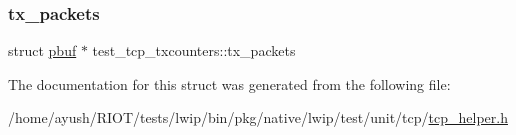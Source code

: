 \mbox{\label{structtest__tcp__txcounters_a9e8e4ba7e34d0fc4f9a839bd75832ead}} 
\subsubsection{\texorpdfstring{tx\+\_\+packets}{tx\_packets}}
{\footnotesize\ttfamily struct \hyperlink{structpbuf}{pbuf} $\ast$ test\+\_\+tcp\+\_\+txcounters\+::tx\+\_\+packets}



The documentation for this struct was generated from the following file\+:\begin{DoxyCompactItemize}
\item 
/home/ayush/\+R\+I\+O\+T/tests/lwip/bin/pkg/native/lwip/test/unit/tcp/\hyperlink{native_2lwip_2test_2unit_2tcp_2tcp__helper_8h}{tcp\+\_\+helper.\+h}\end{DoxyCompactItemize}
